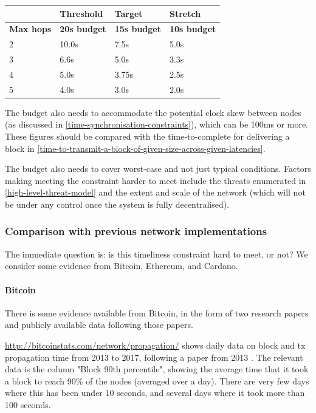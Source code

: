 \documentclass[11pt,a4paper]{article}
\begin{document}
\begin{table}
  \caption{Data diffusion budgets}
  \label{table:data-diffusion-budgets}
\begin{longtable}[]{@{}llll@{}}
\toprule
& Threshold & Target & Stretch\tabularnewline
\midrule
\endhead
\textbf{Max hops} & \textbf{20s budget} & \textbf{15s budget} &
\textbf{10s budget}\tabularnewline
2 & 10.0s & 7.5s & 5.0s\tabularnewline
3 & 6.6s & 5.0s & 3.3s\tabularnewline
4 & 5.0s & 3.75s & 2.5s\tabularnewline
5 & 4.0s & 3.0s & 2.0s\tabularnewline
\bottomrule
\end{longtable}
\end{table}

The budget also needs to accommodate the potential clock skew between
nodes (as discussed in \cref{time-synchronisation-constraints}),
which can be 100ms or more. These figures should
be compared with the time-to-complete for delivering a block in
\cref{time-to-transmit-a-block-of-given-size-across-given-latencies}.

The budget also needs to cover worst-case and not just typical
conditions. Factors making meeting the constraint harder to meet include
the threats enumerated in
\cref{high-level-threat-model} and the extent and
scale of the network (which will not be under any control once the
system is fully decentralised).

\subsubsection{Comparison with previous network implementations}
\label{comparison-with-previous-network-implementations}

The immediate question is: is this timeliness constraint hard to meet,
or not? We consider some evidence from Bitcoin, Ethereum, and Cardano.

\paragraph{Bitcoin}
\label{bitcoin}

There is some evidence available from Bitcoin, in the form of two
research papers and publicly available data following those papers.

\href{http://bitcoinstats.com/network/propagation/}{{http://bitcoinstats.com/network/propagation/}}
shows daily data on block and tx propagation time from 2013 to 2017,
following a paper from 2013 \cite{DW13}. The relevant data is the column
"Block 90th percentile", showing the average time that it took a block
to reach 90\% of the nodes (averaged over a day). There are very few
days where this has been under 10 seconds, and several days where it
took more than 100 seconds.
\end{document}

